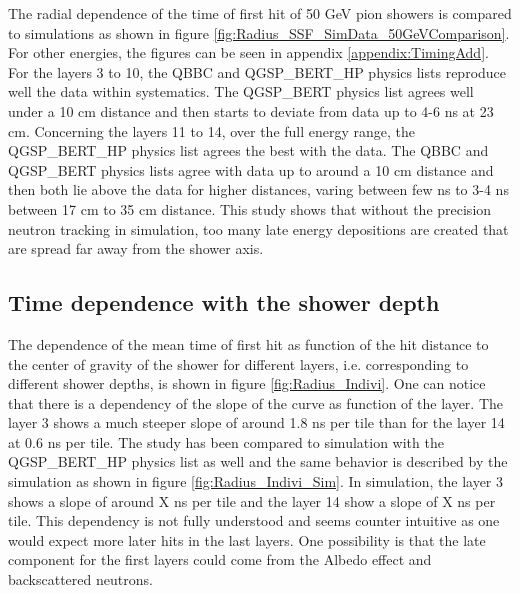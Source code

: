 The radial dependence of the time of first hit of 50 GeV pion showers is compared to simulations as shown in figure \ref{fig:Radius_SSF_SimData_50GeVComparison}. For other energies, the figures can be seen in appendix \ref{appendix:TimingAdd}. For the layers 3 to 10, the QBBC and QGSP\_BERT\_HP physics lists reproduce well the data within systematics. The QGSP\_BERT physics list agrees well under a 10 cm distance and then starts to deviate from data up to 4-6 ns at 23 cm. Concerning the layers 11 to 14, over the full energy range, the QGSP\_BERT\_HP physics list agrees the best with the data. The QBBC and QGSP\_BERT physics lists agree with data up to around a 10 cm distance and then both lie above the data for higher distances, varing between few ns to 3-4 ns between 17 cm to 35 cm distance. This study shows that without the precision neutron tracking in simulation, too many late energy depositions are created that are spread far away from the shower axis.

\subsection{Time dependence with the shower depth}
\label{sec:TimeRadiusDepth}

The dependence of the mean time of first hit as function of the hit distance to the center of gravity of the shower for different layers, i.e. corresponding to different shower depths, is shown in figure \ref{fig:Radius_Indivi}. One can notice that there is a dependency of the slope of the curve as function of the layer. The layer 3 shows a much steeper slope of around 1.8 ns per tile than for the layer 14 at 0.6 ns per tile. The study has been compared to simulation with the QGSP\_BERT\_HP physics list as well and the same behavior is described by the simulation as shown in figure \ref{fig:Radius_Indivi_Sim}. In simulation, the layer 3 shows a slope of around X ns per tile and the layer 14 show a slope of X ns per tile. This dependency is not fully understood and seems counter intuitive as one would expect more later hits in the last layers. One possibility is that the late component for the first layers could come from the Albedo effect \cite{ELLSWORTH1982167} and backscattered neutrons.

